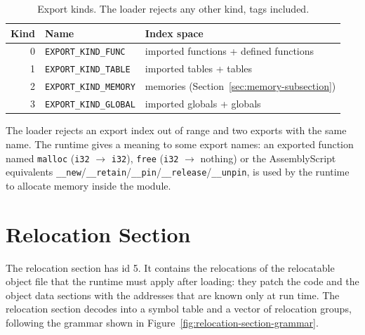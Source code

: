 \documentclass{article}
\begin{document}
\begin{table}[H]
\centering
\begin{tabular}{rll}
    \hline
    Kind & Name & Index space \\
    \hline
    0 & \verb|EXPORT_KIND_FUNC|   & imported functions + defined functions \\
    1 & \verb|EXPORT_KIND_TABLE|  & imported tables + tables \\
    2 & \verb|EXPORT_KIND_MEMORY| & memories (Section~\ref{sec:memory-subsection}) \\
    3 & \verb|EXPORT_KIND_GLOBAL| & imported globals + globals \\
    \hline
\end{tabular}
\caption{Export kinds. The loader rejects any other kind, tags included.}
\label{table:export-kinds}
\end{table}

The loader rejects an export index out of range and two exports with the same name.
The runtime gives a meaning to some export names: an exported function named \verb|malloc| (\verb|i32| $\rightarrow$ \verb|i32|), \verb|free| (\verb|i32| $\rightarrow$ nothing) or the AssemblyScript equivalents \verb|__new|/\verb|__retain|/\verb|__pin|/\verb|__release|/\verb|__unpin|, is used by the runtime to allocate memory inside the module.

\section{Relocation Section}
\label{sec:relocation}
The relocation section has id 5.
It contains the relocations of the relocatable object file that the runtime must apply after loading: they patch the code and the object data sections with the addresses that are known only at run time.
The relocation section decodes into a symbol table and a vector of relocation groups, following the grammar shown in Figure~\ref{fig:relocation-section-grammar}.
\end{document}
